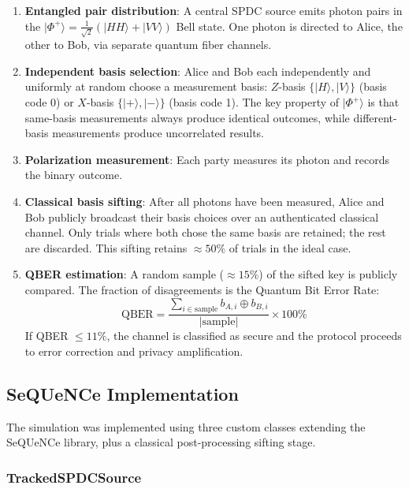 \documentclass[12pt,oneside,letterpaper,english]{article}
\begin{document}
\begin{enumerate}
    \item \textbf{Entangled pair distribution}: A central SPDC source emits photon pairs in the $|\Phi^+\rangle = \frac{1}{\sqrt{2}}(|HH\rangle + |VV\rangle)$ Bell state. One photon is directed to Alice, the other to Bob, via separate quantum fiber channels.
    \item \textbf{Independent basis selection}: Alice and Bob each independently and uniformly at random choose a measurement basis: $Z$-basis $\{|H\rangle, |V\rangle\}$ (basis code 0) or $X$-basis $\{|+\rangle, |-\rangle\}$ (basis code 1). The key property of $|\Phi^+\rangle$ is that same-basis measurements always produce identical outcomes, while different-basis measurements produce uncorrelated results.
    \item \textbf{Polarization measurement}: Each party measures its photon and records the binary outcome.
    \item \textbf{Classical basis sifting}: After all photons have been measured, Alice and Bob publicly broadcast their basis choices over an authenticated classical channel. Only trials where both chose the same basis are retained; the rest are discarded. This sifting retains $\approx 50\%$ of trials in the ideal case.
    \item \textbf{QBER estimation}: A random sample ($\approx 15\%$) of the sifted key is publicly compared. The fraction of disagreements is the Quantum Bit Error Rate:
    \begin{equation}
        \text{QBER} = \frac{\sum_{i \in \text{sample}} b_{A,i} \oplus b_{B,i}}{|\text{sample}|} \times 100\%
        \label{eq:qber}
    \end{equation}
    If QBER $\leq 11\%$, the channel is classified as secure and the protocol proceeds to error correction and privacy amplification.
\end{enumerate}

\subsection{SeQUeNCe Implementation}

The simulation was implemented using three custom classes extending the SeQUeNCe library, plus a classical post-processing sifting stage.

\subsubsection{TrackedSPDCSource}
\end{document}
